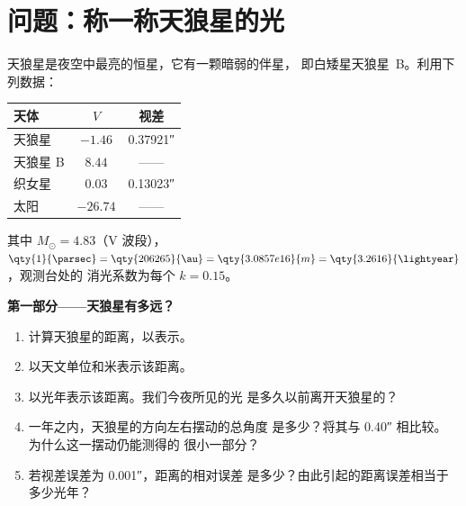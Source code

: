 \section{问题：称一称天狼星的光}

\begin{problem}
\label{pb:b1:observing-the-sky:1}
天狼星是夜空中最亮的恒星，它有一颗暗弱的伴星，
即白矮星天狼星~B。利用下列数据：
\begin{center}
\small
\begin{tabular}{lcc}
\hline
天体 & $V$ & 视差 \\
\hline
天狼星 & $-1.46$ & \ang{;;0.37921} \\
天狼星 B & $8.44$ &——\\
织女星 & $0.03$ & \ang{;;0.13023} \\
太阳 & $-26.74$ &——\\
\hline
\end{tabular}
\end{center}
其中 $M_\odot = 4.83$（V 波段），$\qty{1}{\parsec} = \qty{206265}{\au} =
\qty{3.0857e16}{m} = \qty{3.2616}{\lightyear}$，观测台处的
消光系数为每个 $k = 0.15$。

\medskip
\noindent\textbf{第一部分——天狼星有多远？}
\begin{enumerate}
  \item 计算天狼星的距离，以表示。
  \item 以天文单位和米表示该距离。
  \item 以光年表示该距离。我们今夜所见的光
        是多久以前离开天狼星的？
  \item 一年之内，天狼星的方向左右摆动的总角度
        是多少？将其与 \ang{;;0.40} 相比较。
        为什么这一摆动仍能测得的
        很小一部分？
  \item 若视差误差为 \ang{;;0.001}，距离的相对误差
        是多少？由此引起的距离误差相当于多少光年？
\end{enumerate}


\end{problem}
